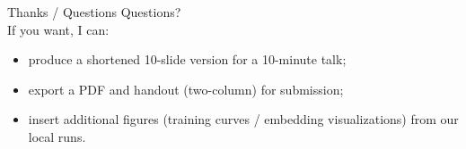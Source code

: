\documentclass{beamer}
\begin{document}
\begin{frame}{Thanks / Questions}
  \centering
  \Large Questions? \\
  \vspace{8pt}
  \small If you want, I can:
  \begin{itemize}
    \item produce a shortened 10-slide version for a 10-minute talk;
    \item export a PDF and handout (two-column) for submission;
    \item insert additional figures (training curves / embedding visualizations) from our local runs.
  \end{itemize}
\end{frame}
\end{document}
